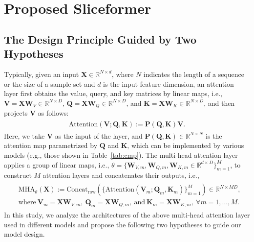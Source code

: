 \section{Proposed Sliceformer}\label{sec:model}
\subsection{The Design Principle Guided by Two Hypotheses}
Typically, given an input $\bm{X}\in\mathbb{R}^{N\times d}$, where $N$ indicates the length of a sequence or the size of a sample set and $d$ is the input feature dimension, an attention layer first obtains the value, query, and key matrices by linear maps, i.e., $\bm{V}=\bm{X}\bm{W}_V\in\mathbb{R}^{N\times D}$, $\bm{Q}=\bm{X}\bm{W}_Q\in\mathbb{R}^{N\times D}$, and $\bm{K}=\bm{X}\bm{W}_K\in\mathbb{R}^{N\times D}$, and then projects $\bm{V}$ as follows:
\begin{eqnarray}\label{eq:att}
\begin{aligned}
    \text{Attention}(\bm{V};\bm{Q},\bm{K}):=\bm{P}(\bm{Q},\bm{K})\bm{V}.
\end{aligned}
\end{eqnarray}
Here, we take $\bm{V}$ as the input of the layer, and $\bm{P}(\bm{Q},\bm{K})\in\mathbb{R}^{N\times N}$ is the attention map parametrized by $\bm{Q}$ and $\bm{K}$, which can be implemented by various models (e.g., those shown in Table~\ref{tab:cmp}). 
The multi-head attention layer applies a group of linear maps, i.e., $\theta=\{\bm{W}_{V,m},\bm{W}_{Q,m},\bm{W}_{K,m}\in\mathbb{R}^{d\times D}\}_{m=1}^{M}$, to construct $M$ attention layers and concatenates their outputs, i.e.,
\begin{eqnarray}\label{eq:mha}
\begin{aligned}
    &\text{MHA}_{\theta}(\bm{X}) := \text{Concat}_{\text{row}}(\{\text{Attention}(\bm{V}_m;\bm{Q}_m,\bm{K}_m)\}_{m=1}^{M})\in\mathbb{R}^{N\times MD},\\
    &\text{where}~\bm{V}_m=\bm{X}\bm{W}_{V,m},~\bm{Q}_m=\bm{X}\bm{W}_{Q,m},~\text{and}~\bm{K}_m=\bm{X}\bm{W}_{K,m},~\forall m=1,...,M.
\end{aligned}
\end{eqnarray}
In this study, we analyze the architectures of the above multi-head attention layer used in different models and propose the following two hypotheses to guide our model design. 

